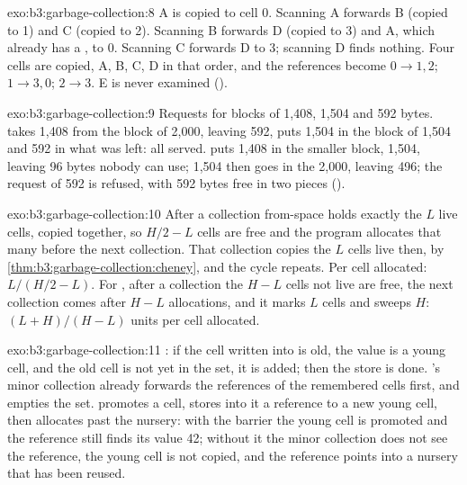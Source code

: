 \begin{solution}{exo:b3:garbage-collection:8}
A is copied to cell 0. Scanning A forwards B (copied to 1) and C (copied to 2). Scanning B forwards D (copied to 3) and A, which already has a , to 0. Scanning C forwards D to 3; scanning D finds nothing. Four cells are copied, A, B, C, D in that order, and the references become $0 \to 1, 2$; $1 \to 3, 0$; $2 \to 3$. E is never examined ().
\end{solution}

\begin{solution}{exo:b3:garbage-collection:9}
Requests for blocks of 1,408, 1,504 and 592 bytes.  takes 1,408 from the block of 2,000, leaving 592, puts 1,504 in the block of 1,504 and 592 in what was left: all served.  puts 1,408 in the smaller block, 1,504, leaving 96 bytes nobody can use; 1,504 then goes in the 2,000, leaving 496; the request of 592 is refused, with 592 bytes free in two pieces ().
\end{solution}

\begin{solution}{exo:b3:garbage-collection:10}
After a collection from-space holds exactly the $L$ live cells, copied together, so $H/2 - L$ cells are free and the program allocates that many before the next collection. That collection copies the $L$ cells live then, by \cref{thm:b3:garbage-collection:cheney}, and the cycle repeats. Per cell allocated: $L/(H/2 - L)$. For , after a collection the $H - L$ cells not live are free, the next collection comes after $H - L$ allocations, and it marks $L$ cells and sweeps $H$: $(L + H)/(H - L)$ units per cell allocated.
\end{solution}

\begin{solution}{exo:b3:garbage-collection:11}
: if the cell written into is old, the value is a young cell, and the old cell is not yet in the set, it is added; then the store is done. 's minor collection already forwards the references of the remembered cells first, and empties the set.  promotes a cell, stores into it a reference to a new young cell, then allocates past the nursery: with the barrier the young cell is promoted and the reference still finds its value 42; without it the minor collection does not see the reference, the young cell is not copied, and the reference points into a nursery that has been reused.
\end{solution}

